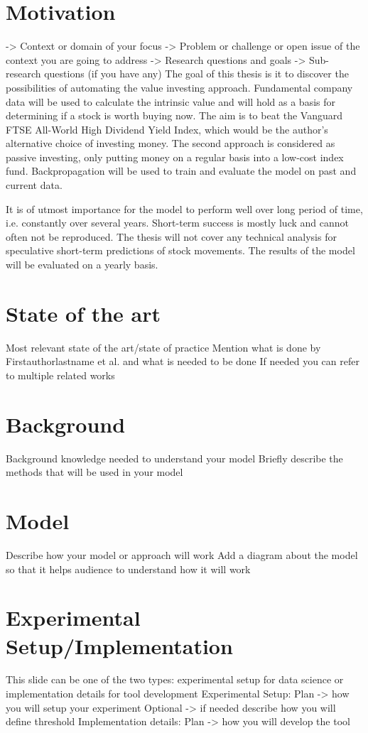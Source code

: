 \documentclass{imc-inf}
\begin{document}
\section{Motivation}
-> Context or domain of your focus
-> Problem or challenge or open issue of the context you are going to address
-> Research questions and goals
-> Sub-research questions (if you have any)
The goal of this thesis is it to discover the possibilities of automating the value investing approach. Fundamental company data will be used to calculate the intrinsic value and will hold as a basis for determining if a stock is worth buying now. The aim is to beat the Vanguard FTSE All-World High Dividend Yield Index, which would be the author's alternative choice of investing money. The second approach is considered as passive investing, only putting money on a regular basis into a low-cost index fund. Backpropagation will be used to train and evaluate the model on past and current data. 

It is of utmost importance for the model to perform well over long period of time, i.e. constantly over several years. Short-term success is mostly luck and cannot often not be reproduced. The thesis will not cover any technical analysis for speculative short-term predictions of stock movements. The results of the model will be evaluated on a yearly basis.
\section{State of the art}
Most relevant state of the art/state of practice
Mention what is done by Firstauthorlastname et al. and what is needed to be done
If needed you can refer to multiple related works

\section{Background}
Background knowledge needed to understand your model
Briefly describe the methods that will be used in your model

\section{Model}

Describe how your model or approach will work
Add a diagram about the model so that it helps audience to understand how it will work

\section{Experimental Setup/Implementation}
This slide can be one of the two types: experimental setup for data science or implementation details for tool development
Experimental Setup:
Plan -> how you will setup your experiment
Optional -> if needed describe how you will define threshold
Implementation details:
Plan -> how you will develop the tool
\end{document}
